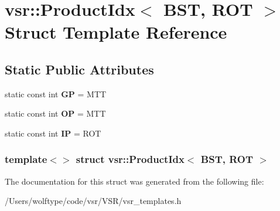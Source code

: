 \hypertarget{structvsr_1_1_product_idx_3_01_b_s_t_00_01_r_o_t_01_4}{\section{vsr\-:\-:Product\-Idx$<$ B\-S\-T, R\-O\-T $>$ Struct Template Reference}
\label{structvsr_1_1_product_idx_3_01_b_s_t_00_01_r_o_t_01_4}
}
\subsection*{Static Public Attributes}
\begin{DoxyCompactItemize}
\item 
\hypertarget{structvsr_1_1_product_idx_3_01_b_s_t_00_01_r_o_t_01_4_a5ef627e1d93d860a0813d935bd1e0c81}{static const int {\bfseries G\-P} = M\-T\-T}\label{structvsr_1_1_product_idx_3_01_b_s_t_00_01_r_o_t_01_4_a5ef627e1d93d860a0813d935bd1e0c81}

\item 
\hypertarget{structvsr_1_1_product_idx_3_01_b_s_t_00_01_r_o_t_01_4_a6ba8c3207df860e3da786fdc756f33f6}{static const int {\bfseries O\-P} = M\-T\-T}\label{structvsr_1_1_product_idx_3_01_b_s_t_00_01_r_o_t_01_4_a6ba8c3207df860e3da786fdc756f33f6}

\item 
\hypertarget{structvsr_1_1_product_idx_3_01_b_s_t_00_01_r_o_t_01_4_a636130b2582e9aece33d199482421f23}{static const int {\bfseries I\-P} = R\-O\-T}\label{structvsr_1_1_product_idx_3_01_b_s_t_00_01_r_o_t_01_4_a636130b2582e9aece33d199482421f23}

\end{DoxyCompactItemize}
\subsubsection*{template$<$$>$ struct vsr\-::\-Product\-Idx$<$ B\-S\-T, R\-O\-T $>$}



The documentation for this struct was generated from the following file\-:\begin{DoxyCompactItemize}
\item 
/\-Users/wolftype/code/vsr/\-V\-S\-R/vsr\-\_\-templates.\-h\end{DoxyCompactItemize}
